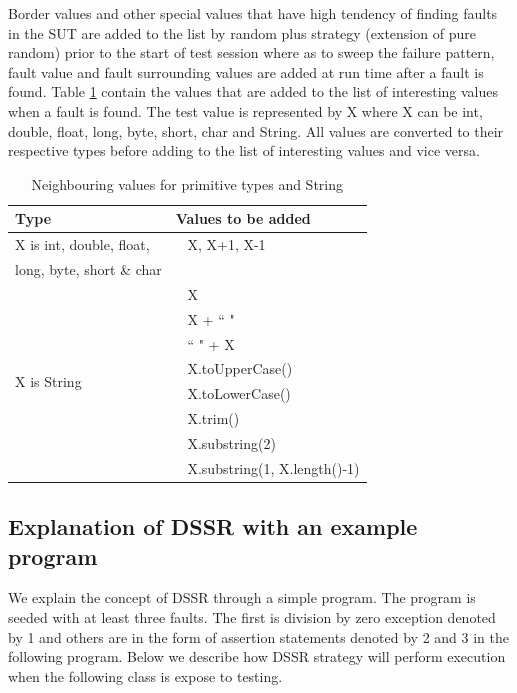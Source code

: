 \documentclass[conference]{IEEEtran}
\begin{document}
Border values and other special values that have high tendency of finding faults in the SUT are added to the list by random plus strategy (extension of pure random) prior to the start of test session where as to sweep the failure pattern, fault value and fault surrounding values are added at run time after a fault is found. Table \ref{table:addvalues} contain the values that are added to the list of interesting values when a fault is found. The test value is represented by X where X can be int, double, float, long, byte, short, char and String. All values are converted to their respective types before adding to the list of interesting values and vice versa.

\begin{table}[ht]
\caption{Neighbouring values for primitive types and String} %
\centering %
\begin{tabular}{| l | l |} %
\hline\hline %
Type & Values to be added\\ [0.5ex] %
\hline %
\multirow{1}{*}{X is int, double, float, } & ~ X,  X+1, X-1 \\ %
\multirow{1}{*}{long, byte, short \& char} &  \\ 

\hline
\multirow{8}{*}{X is String} & ~ X\\ %

& ~ X + ``  "\\ %
& ~ ``  " + X \\ %
& ~ X.toUpperCase() \\
& ~ X.toLowerCase() \\
& ~ X.trim() \\
& ~ X.substring(2) \\
& ~ X.substring(1, X.length()-1) \\[1ex]
\hline
\hline %
\end{tabular}
\label{table:addvalues} %
\end{table}
\subsection{Explanation of DSSR with an example program}
We explain the concept of DSSR through a simple program. The program is seeded with at least three faults. The first is division by zero exception denoted by 1 and others are in the form of assertion statements denoted by 2 and 3 in the following program.  Below we describe how DSSR strategy will perform execution when the following class is expose to testing.\\
\end{document}
